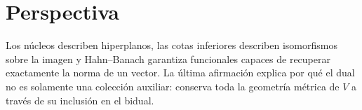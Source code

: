 \section{Perspectiva}
Los núcleos describen hiperplanos, las cotas inferiores describen isomorfismos sobre la imagen y Hahn--Banach garantiza funcionales capaces de recuperar exactamente la norma de un vector. La última afirmación explica por qué el dual no es solamente una colección auxiliar: conserva toda la geometría métrica de $V$ a través de su inclusión en el bidual.
